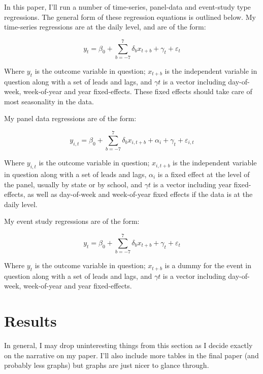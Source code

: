 \documentclass[AER,draftmode]{AEA}
\begin{document}
In this paper, I'll run a number of time-series, panel-data and event-study type regressions. The general form of these regression equations is outlined below. My time-series regressions are at the daily level, and are of the form: 

$$ 
y_{t} = \beta_{0} + \sum_{b=-7}^{7} \delta_{b} x_{t+b} + \gamma_{t} + \varepsilon_{t}
$$

Where $y_{t}$ is the outcome variable in question; $x_{t+b}$ is the independent variable in question along with a set of leads and lags, and $\gamma{t}$ is a vector including day-of-week, week-of-year and year fixed-effects. These fixed effects should take care of most seasonality in the data. 

My panel data regressions are of the form:

$$ 
y_{i,t} = \beta_{0} + \sum_{b=-7}^{7} \delta_{b} x_{i,t+b} + \alpha_{i} + \gamma_{t} + \varepsilon_{i,t}
$$

Where $y_{i,t}$ is the outcome variable in question; $x_{i,t+b}$ is the independent variable in question along with a set of leads and lags, $\alpha_{i}$ is a fixed effect at the level of the panel, usually by state or by school, and $\gamma{t}$ is a vector including year fixed-effects, as well as day-of-week and week-of-year fixed effects if the data is at the daily level.

My event study regressions are of the form:

$$ 
y_{t} = \beta_{0} + \sum_{b=-7}^{7} \delta_{b} x_{t+b} + \gamma_{t} + \varepsilon_{t}
$$

Where $y_{t}$ is the outcome variable in question; $x_{t+b}$ is a dummy for the event in question along with a set of leads and lags, and $\gamma{t}$ is a vector including day-of-week, week-of-year and year fixed-effects.

\section{Results}

In general, I may drop uninteresting things from this section as I decide exactly on the narrative on my paper. I'll also include more tables in the final paper (and probably less graphs) but graphs are just nicer to glance through.
\end{document}
